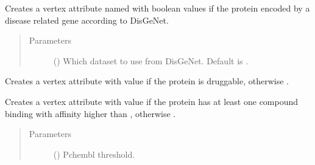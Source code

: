 \documentclass[letterpaper,10pt,english]{sphinxmanual}
\begin{document}
\begin{fulllineitems}
\begin{fulllineitems}
\label{\detokenize{main:pypath.main.PyPath.set_disease_genes}}
Creates a vertex attribute named  with boolean values 
if the protein encoded by a disease related gene according to
DisGeNet.
\begin{quote}\begin{description}
\item[{Parameters}] \leavevmode
{} () \textendash{} Which dataset to use from DisGeNet. Default is .

\end{description}\end{quote}

\end{fulllineitems}


\begin{fulllineitems}
\label{\detokenize{main:pypath.main.PyPath.set_druggability}}
Creates a vertex attribute  with value  if
the protein is druggable, otherwise .

\end{fulllineitems}


\begin{fulllineitems}
\label{\detokenize{main:pypath.main.PyPath.set_drugtargets}}
Creates a vertex attribute  with value  if
the protein has at least one compound binding with
affinity higher than , otherwise .
\begin{quote}\begin{description}
\item[{Parameters}] \leavevmode
{} () \textendash{} Pchembl threshold.


\end{description}
\end{quote}
\end{fulllineitems}
\end{fulllineitems}
\end{document}
